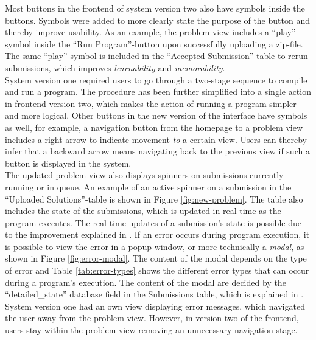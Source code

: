 Most buttons in the frontend of system version two also have symbols inside the buttons. Symbols were added to more clearly state the purpose of the button and thereby improve usability. As an example, the problem-view includes a ``play''-symbol inside the ``Run Program''-button upon successfully uploading a zip-file. The same ``play''-symbol is included in the ``Accepted Submission'' table to rerun submissions, which improves \textit{learnability} and \textit{memorability}. \\

System version one required users to go through a two-stage sequence to compile and run a program. The procedure has been further simplified into a single action in frontend version two, which makes the action of running a program simpler and more logical. Other buttons in the new version of the interface have symbols as well, for example, a navigation button from the homepage to a problem view includes a right arrow to indicate movement \textit{to} a certain view. Users can thereby infer that a backward arrow means navigating back to the previous view if such a button is displayed in the system. \\

The updated problem view also displays spinners on submissions currently running or in queue. An example of an active spinner on a submission in the ``Uploaded Solutions''-table is shown in Figure \ref{fig:new-problem}. The table also includes the state of the submissions, which is updated in real-time as the program executes. The real-time updates of a submission's state is possible due to the improvement explained in . If an error occurs during program execution, it is possible to view the error in a popup window, or more technically a \textit{modal}, as shown in Figure \ref{fig:error-modal}. The content of the modal depends on the type of error and Table \ref{tab:error-types} shows the different error types that can occur during a program's execution. The content of the modal are decided by the ``detailed\_state'' database field in the Submissions table, which is explained in . System version one had an own view displaying error messages, which navigated the user away from the problem view. However, in version two of the frontend, users stay within the problem view removing an unnecessary navigation stage. \\

